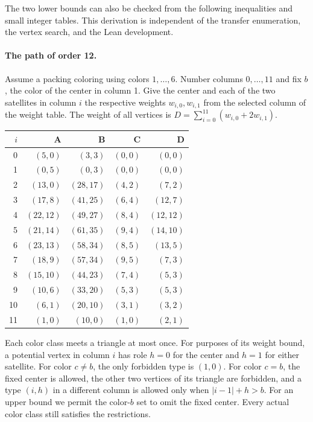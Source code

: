 \documentclass[11pt]{article}
\begin{document}
The two lower bounds can also be checked from the following inequalities and small integer tables. This derivation is independent of the transfer enumeration, the vertex search, and the Lean development.

\paragraph{The path of order 12.} Assume a packing coloring using colors \(1,\ldots,6\). Number columns \(0,\ldots,11\) and fix \(b\), the color of the center in column 1. Give the center and each of the two satellites in column \(i\) the respective weights \(w_{i,0},w_{i,1}\) from the selected column of the weight table. The weight of all vertices is \(D=\sum_{i=0}^{11}(w_{i,0}+2w_{i,1})\).

\begin{center}\small
\begin{tabular}{@{}rrrrr@{}}
\toprule
\(i\) & A & B & C & D\\
\midrule
0 & \((5,0)\) & \((3,3)\) & \((0,0)\) & \((0,0)\)\\
1 & \((0,5)\) & \((0,3)\) & \((0,0)\) & \((0,0)\)\\
2 & \((13,0)\) & \((28,17)\) & \((4,2)\) & \((7,2)\)\\
3 & \((17,8)\) & \((41,25)\) & \((6,4)\) & \((12,7)\)\\
4 & \((22,12)\) & \((49,27)\) & \((8,4)\) & \((12,12)\)\\
5 & \((21,14)\) & \((61,35)\) & \((9,4)\) & \((14,10)\)\\
6 & \((23,13)\) & \((58,34)\) & \((8,5)\) & \((13,5)\)\\
7 & \((18,9)\) & \((57,34)\) & \((9,5)\) & \((7,3)\)\\
8 & \((15,10)\) & \((44,23)\) & \((7,4)\) & \((5,3)\)\\
9 & \((10,6)\) & \((33,20)\) & \((5,3)\) & \((5,3)\)\\
10 & \((6,1)\) & \((20,10)\) & \((3,1)\) & \((3,2)\)\\
11 & \((1,0)\) & \((10,0)\) & \((1,0)\) & \((2,1)\)\\
\bottomrule
\end{tabular}
\end{center}

Each color class meets a triangle at most once. For purposes of its weight bound, a potential vertex in column \(i\) has role \(h=0\) for the center and \(h=1\) for either satellite. For color \(c\ne b\), the only forbidden type is \((1,0)\). For color \(c=b\), the fixed center is allowed, the other two vertices of its triangle are forbidden, and a type \((i,h)\) in a different column is allowed only when \(|i-1|+h>b\). For an upper bound we permit the color-\(b\) set to omit the fixed center. Every actual color class still satisfies the restrictions.
\end{document}
